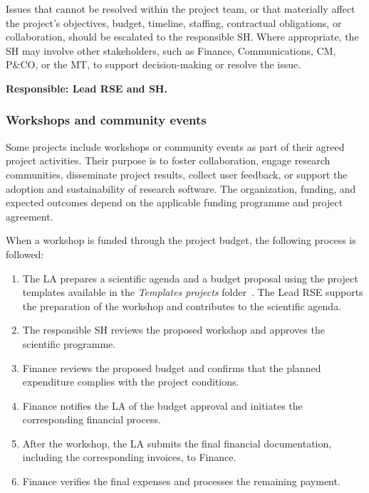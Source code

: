 Issues that cannot be resolved within the project team, or that materially affect the project’s objectives, budget, 
timeline, staffing, contractual obligations, or collaboration, should be escalated to the responsible SH. Where 
appropriate, the SH may involve other stakeholders, such as Finance, Communications, CM, P\&CO, or the MT, 
to support decision-making or resolve the issue.

\textbf{Responsible: Lead RSE and SH.}

\subsubsection{Workshops and community events}
\label{sec:exec:workshops}
Some projects include workshops or community events as part of their agreed project activities. Their purpose is to
foster collaboration, engage research communities, disseminate project results, collect user feedback, or support the
adoption and sustainability of research software. The organization, funding, and expected outcomes depend on the
applicable funding programme and project agreement.

When a workshop is funded through the project budget, the following process is followed:
\vspace{-0.2cm}
\begin{enumerate}
\item The LA prepares a scientific agenda and a budget proposal using the project templates available in the 
\textit{Templates projects} folder~\cite{proj-portfolio}. The Lead RSE supports the preparation of the workshop 
and contributes to the scientific agenda.
\item The responsible SH reviews the proposed workshop and approves the scientific programme.
\item Finance reviews the proposed budget and confirms that the planned expenditure complies with the project conditions.
\item Finance notifies the LA of the budget approval and initiates the corresponding financial process.
\item After the workshop, the LA submits the final financial documentation, including the corresponding invoices, to Finance.
\item Finance verifies the final expenses and processes the remaining payment.
\end{enumerate}  


